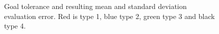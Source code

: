 \begin{figure}
    
    \caption{Goal tolerance and resulting mean and standard deviation evaluation error. Red is type 1, blue type 2, green type 3 and black type 4.}
    \label{fig:learning}
\end{figure}

